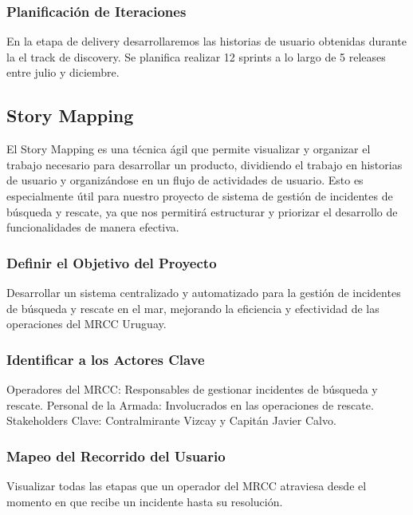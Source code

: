 \subsubsection{Planificación de Iteraciones}

En la etapa de delivery desarrollaremos las historias de usuario obtenidas durante la el track de discovery. 
Se planifica realizar 12 sprints a lo largo de 5 releases entre julio y diciembre.


\subsection{Story Mapping}

El Story Mapping es una técnica ágil que permite visualizar y organizar el trabajo necesario para desarrollar un 
producto, dividiendo el trabajo en historias de usuario y organizándose en un flujo de actividades de usuario. 
Esto es especialmente útil para nuestro proyecto de sistema de gestión de incidentes de búsqueda y rescate, ya que 
nos permitirá estructurar y priorizar el desarrollo de funcionalidades de manera efectiva.

\subsubsection{ Definir el Objetivo del Proyecto}
Desarrollar un sistema centralizado y automatizado para la gestión de incidentes de búsqueda y rescate en el mar, 
mejorando la eficiencia y efectividad de las operaciones del MRCC Uruguay.

\subsubsection{Identificar a los Actores Clave}
Operadores del MRCC: Responsables de gestionar incidentes de búsqueda y rescate.
Personal de la Armada: Involucrados en las operaciones de rescate.
Stakeholders Clave: Contralmirante Vizcay y Capitán Javier Calvo.

\subsubsection{Mapeo del Recorrido del Usuario}
Visualizar todas las etapas que un operador del MRCC atraviesa desde el momento en que recibe un incidente hasta su 
resolución.


